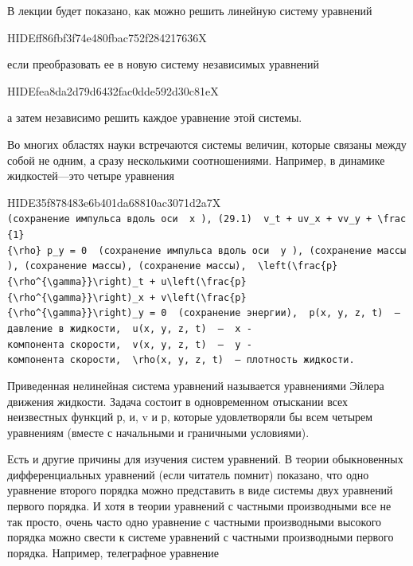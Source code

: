 \documentclass[
  ukrainian,
]{article}
\begin{document}
В лекции будет показано, как можно решить линейную систему уравнений

HIDEff86fbf3f74e480fbac752f284217636X

если преобразовать ее в новую систему независимых уравнений

HIDEfea8da2d79d6432fac0dde592d30c81eX

а затем независимо решить каждое уравнение этой системы.

Во многих областях науки встречаются системы величин, которые связаны
между собой не одним, а сразу несколькими соотношениями. Например, в
динамике жидкостей---это четыре уравнения

HIDE35f878483e6b401da68810ac3071d2a7X
\texttt{(сохранение\ импульса\ вдоль\ оси\ \ \textquotesingle{}x\textquotesingle{}\ ),\ (29.1)\ \ \textquotesingle{}v\_t\ +\ uv\_x\ +\ vv\_y\ +\ \textbackslash{}frac\{1\}\{\textbackslash{}rho\}\ p\_y\ =\ 0\textquotesingle{}\ \ (сохранение\ импульса\ вдоль\ оси\ \ \textquotesingle{}y\textquotesingle{}\ ),\ (сохранение\ массы),\ (сохранение\ массы),\ (сохранение\ массы),\ \ \textquotesingle{}\textbackslash{}left(\textbackslash{}frac\{p\}\{\textbackslash{}rho\^{}\{\textbackslash{}gamma\}\}\textbackslash{}right)\_t\ +\ u\textbackslash{}left(\textbackslash{}frac\{p\}\{\textbackslash{}rho\^{}\{\textbackslash{}gamma\}\}\textbackslash{}right)\_x\ +\ v\textbackslash{}left(\textbackslash{}frac\{p\}\{\textbackslash{}rho\^{}\{\textbackslash{}gamma\}\}\textbackslash{}right)\_y\ =\ 0\textquotesingle{}\ \ (сохранение\ энергии),\ \ \textquotesingle{}p(x,\ y,\ z,\ t)\textquotesingle{}\ \ —\ давление\ в\ жидкости,\ \ \textquotesingle{}u(x,\ y,\ z,\ t)\textquotesingle{}\ \ —\ \ \textquotesingle{}x\textquotesingle{}\ -компонента\ скорости,\ \ \textquotesingle{}v(x,\ y,\ z,\ t)\textquotesingle{}\ \ —\ \ \textquotesingle{}y\textquotesingle{}\ -компонента\ скорости,\ \ \textquotesingle{}\textbackslash{}rho(x,\ y,\ z,\ t)\textquotesingle{}\ \ —\ плотность\ жидкости.}

Приведенная нелинейная система уравнений называется уравнениями Эйлера
движения жидкости. Задача состоит в одновременном отыскании всех
неизвестных функций р, и, v и р, которые удовлетворяли бы всем четырем
уравнениям (вместе с начальными и граничными условиями).

Есть и другие причины для изучения систем уравнений. В теории
обыкновенных дифференциальных уравнений (если читатель помнит) показано,
что одно уравнение второго порядка можно представить в виде системы двух
уравнений первого порядка. И хотя в теории уравнений с частными
производными все не так просто, очень часто одно уравнение с частными
производными высокого порядка можно свести к системе уравнений с
частными производными первого порядка. Например, телеграфное уравнение
\end{document}
